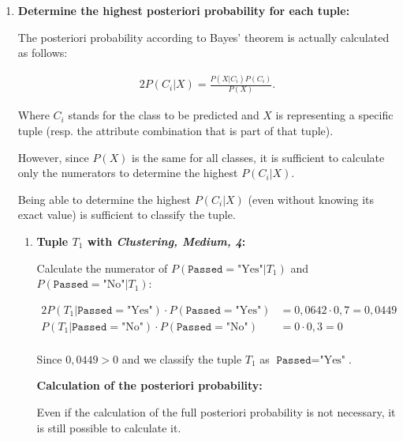 \documentclass[
english,
smallborders
]{i6prcsht}
\newcommand{\BayesNumerator}[3]{P(#1 | \texttt{#2}=\text{"#3"}) \cdot P(\texttt{#2}=\text{"#3"})}
\newcommand{\PosterioriProbability}[3]{P(\texttt{#2}=\text{"#3"} | #1)}
\newcommand{\ResultClass}[2]{\texttt{#1}=\text{"#2"}}
\begin{document}
\begin{solution}
\begin{enumerate}
		\item \textbf{Determine the highest posteriori probability for each tuple:}

		      The posteriori probability according to Bayes' theorem is actually calculated as follows:

		      \begin{alignat*}{2}
			      P(C_i|X) = \frac{P(X|C_i)P(C_i)}{P(X)}.
		      \end{alignat*}

		      Where $C_i$ stands for the class to be predicted and $X$ is representing a specific tuple (resp. the attribute combination that is part of that tuple).

		      However, since $P(X)$ is the same for all classes, it is sufficient to calculate only the numerators to determine the highest $P(C_i|X)$.

		      Being able to determine the highest $P(C_i|X)$ (even without knowing its exact value) is sufficient to classify the tuple.

		      \begin{enumerate}
			      \item \textbf{Tuple $T_1$ with \textit{Clustering, Medium, 4}:}

			            Calculate the numerator of $\PosterioriProbability{T_1}{Passed}{Yes}$ and $\PosterioriProbability{T_1}{Passed}{No}$:

			            \begin{alignat*}{2}
				            \BayesNumerator{T_1}{Passed}{Yes} & = 0,0642 \cdot 0,7 = 0,0449 \\
				            \BayesNumerator{T_1}{Passed}{No}  & = 0 \cdot 0,3 = 0           \\
			            \end{alignat*}

			            Since $0,0449 > 0$ and we classify the tuple $T_1$ as $\ResultClass{Passed}{Yes}$.

			            \vspace*{3em}

			            \begin{mdframed}[linecolor=solutioncolor]
				            \color{solutioncolor}
				            \begin{em}
					            \textbf{Calculation of the posteriori probability:}

					            Even if the calculation of the full posteriori probability is not necessary, it is still possible to calculate it.


\end{em}
\end{mdframed}
\end{enumerate}
\end{enumerate}
\end{solution}
\end{document}
